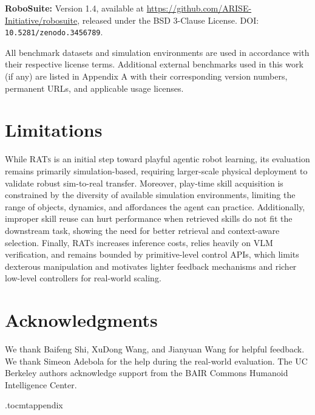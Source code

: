 \documentclass{article}
\begin{document}
\textbf{RoboSuite:} Version 1.4, available at \url{https://github.com/ARISE-Initiative/robosuite}, released under the BSD 3-Clause License. DOI: \texttt{10.5281/zenodo.3456789}.

All benchmark datasets and simulation environments are used in accordance with their respective license terms. Additional external benchmarks used in this work (if any) are listed in Appendix A with their corresponding version numbers, permanent URLs, and applicable usage licenses.


	

	

\section*{Limitations}
While \textsc{RATs} is an initial step toward playful agentic robot learning, its evaluation remains primarily simulation-based, requiring larger-scale physical deployment to validate robust sim-to-real transfer. Moreover, play-time skill acquisition is constrained by the diversity of available simulation environments, limiting the range of objects, dynamics, and affordances the agent can practice. Additionally, improper skill reuse can hurt performance when retrieved skills do not fit the downstream task, showing the need for better retrieval and context-aware selection. Finally, \textsc{RATs} increases inference costs, relies heavily on VLM verification, and remains bounded by primitive-level control APIs, which limits dexterous manipulation and motivates lighter feedback mechanisms and richer low-level controllers for real-world scaling.



\section*{Acknowledgments}
We thank Baifeng Shi, XuDong Wang, and Jianyuan Wang for helpful feedback. We thank Simeon Adebola for the help during the real-world evaluation. The UC Berkeley authors acknowledge support from the BAIR Commons Humanoid Intelligence Center.



\clearpage
\appendix

\etocdepthtag.toc{mtappendix}
\end{document}
